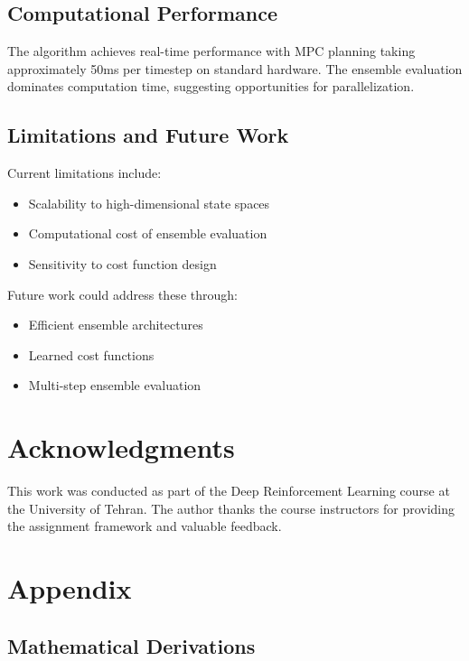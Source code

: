 \documentclass[10pt,twocolumn,letterpaper]{article}
\begin{document}
\subsection{Computational Performance}

The algorithm achieves real-time performance with MPC planning taking approximately 50ms per timestep on standard hardware. The ensemble evaluation dominates computation time, suggesting opportunities for parallelization.

\subsection{Limitations and Future Work}

Current limitations include:
\begin{itemize}
\item Scalability to high-dimensional state spaces
\item Computational cost of ensemble evaluation
\item Sensitivity to cost function design
\end{itemize}

Future work could address these through:
\begin{itemize}
\item Efficient ensemble architectures
\item Learned cost functions
\item Multi-step ensemble evaluation
\end{itemize}

\section*{Acknowledgments}

This work was conducted as part of the Deep Reinforcement Learning course at the University of Tehran. The author thanks the course instructors for providing the assignment framework and valuable feedback.




\appendix

\section{Appendix}

\subsection{Mathematical Derivations}
\end{document}

